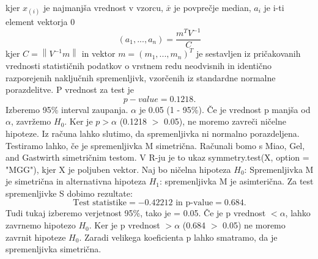 \documentclass[a4paper,11pt]{article}
\begin{document}
kjer \(x_{(i)}\) je najmanjša vrednost v vzorcu, \(\overset{\_}{x}\) je povprečje median, \(a_i\) je i-ti element vektorja 0   
\[(a_1,...,a_n) = \frac{m^T V^{-1}}{C}\]
kjer \( C = \left\| V^{-1}m \right\|\) in vektor \(m = (m_1,...,m_n)^T\) je sestavljen iz pričakovanih vrednosti statističnih podatkov o vrstnem redu neodvisnih in identično razporejenih naključnih spremenljivk, vzorčenih iz standardne normalne porazdelitve. P vrednost za test je 
\[ p-value = 0.1218. \]
Izberemo 95\% interval zaupanja. \(\alpha\) je 0.05 (1 - 95\%). Če je vrednost p manjša od \(\alpha\), zavržemo \(H_0\). Ker je \(p > \alpha\) (0.1218 \(>\) 0.05), ne moremo zavreči ničelne hipoteze. Iz računa lahko slutimo, da spremenljivka ni normalno porazdeljena. Testiramo lahko, če je spremenljivka M simetrična. Računali bomo s Miao, Gel, and Gastwirth simetričnim testom. V R-ju je to ukaz symmetry.test(X, option = "MGG")\cite{lawstat}, kjer X je poljuben vektor. Naj bo ničelna hipoteza \(H_0\): Spremenljivka M je simetrična in alternativna hipoteza \(H_1\): spremenljivka M je asimterična. Za test spremenljivke S dobimo rezultate:
\[\text{Test statistike} = -0.42212 \text{ in p-value} =  0.684.\]
Tudi tukaj izberemo verjetnost 95\%, tako je \alpha = 0.05. Če je p vrednost \(< \alpha\), lahko zavrnemo hipotezo \(H_0\). Ker je p vrednost \(> \alpha\) (0.684 \(>\) 0.05) ne moremo zavrnit hipoteze \(H_0\). Zaradi velikega koeficienta p lahko smatramo, da je spremenljivka simetrična.
\end{document}
